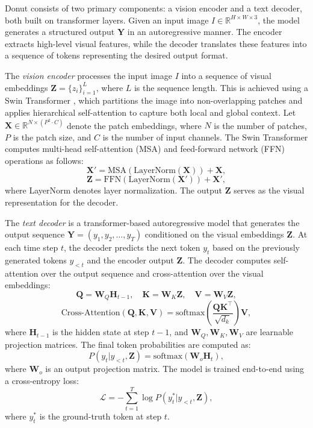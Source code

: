 \documentclass[11pt]{article}
\begin{document}
Donut consists of two primary components: a vision encoder and a text decoder, both built on transformer layers. Given an input image \( I \in \mathbb{R}^{H \times W \times 3} \), the model generates a structured output \( \mathbf{Y} \) in an autoregressive manner. The encoder extracts high-level visual features, while the decoder translates these features into a sequence of tokens representing the desired output format.

The \emph{vision encoder} processes the input image \( I \) into a sequence of visual embeddings \( \mathbf{Z} = \{z_i\}_{i=1}^{L} \), where \( L \) is the sequence length. This is achieved using a Swin Transformer \cite{liu2021swin}, which partitions the image into non-overlapping patches and applies hierarchical self-attention to capture both local and global context. Let \( \mathbf{X} \in \mathbb{R}^{N \times (P^2 \cdot C)} \) denote the patch embeddings, where \( N \) is the number of patches, \( P \) is the patch size, and \( C \) is the number of input channels. The Swin Transformer computes multi-head self-attention (MSA) and feed-forward network (FFN) operations as follows:  
\[
\mathbf{X}' = \text{MSA}(\text{LayerNorm}(\mathbf{X})) + \mathbf{X},  
\]  
\[
\mathbf{Z} = \text{FFN}(\text{LayerNorm}(\mathbf{X}')) + \mathbf{X}',
\]  
where LayerNorm denotes layer normalization. The output \( \mathbf{Z} \) serves as the visual representation for the decoder.

The \emph{text decoder} is a transformer-based autoregressive model that generates the output sequence \( \mathbf{Y} = (y_1, y_2, \dots, y_T) \) conditioned on the visual embeddings \( \mathbf{Z} \). At each time step \( t \), the decoder predicts the next token \( y_t \) based on the previously generated tokens \( y_{<t} \) and the encoder output \( \mathbf{Z} \). The decoder computes self-attention over the output sequence and cross-attention over the visual embeddings:  
\[
\mathbf{Q} = \mathbf{W}_Q \mathbf{H}_{t-1}, \quad \mathbf{K} = \mathbf{W}_K \mathbf{Z}, \quad \mathbf{V} = \mathbf{W}_V \mathbf{Z},
\]  
\[
\text{Cross-Attention}(\mathbf{Q}, \mathbf{K}, \mathbf{V}) = \text{softmax}\left(\frac{\mathbf{Q} \mathbf{K}^\top}{\sqrt{d_k}}\right) \mathbf{V},
\]  
where \( \mathbf{H}_{t-1} \) is the hidden state at step \( t-1 \), and \( \mathbf{W}_Q, \mathbf{W}_K, \mathbf{W}_V \) are learnable projection matrices. The final token probabilities are computed as:  
\[
P(y_t | y_{<t}, \mathbf{Z}) = \text{softmax}(\mathbf{W}_o \mathbf{H}_t),
\]  
where \( \mathbf{W}_o \) is an output projection matrix. The model is trained end-to-end using a cross-entropy loss:  
\[
\mathcal{L} = -\sum_{t=1}^T \log P(y_t^* | y_{<t}, \mathbf{Z}),
\]  
where \( y_t^* \) is the ground-truth token at step \( t \).
\end{document}
